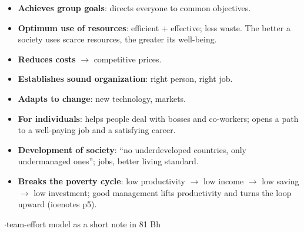 {\color{sub}\footnotesize {} }
\begin{itemize}
  \item \textbf{Achieves group goals}: directs everyone to common objectives.
  \item \textbf{Optimum use of resources}: efficient + effective; less waste. The better a
    society uses scarce resources, the greater its well-being.
  \item \textbf{Reduces costs} $\rightarrow$ competitive prices.
  \item \textbf{Establishes sound organization}: right person, right job.
  \item \textbf{Adapts to change}: new technology, markets.
  \item \textbf{For individuals}: helps people deal with bosses and co-workers; opens a
    path to a well-paying job and a satisfying career.
  \item \textbf{Development of society}: ``no underdeveloped countries, only undermanaged
    ones''; jobs, better living standard.
  \item \textbf{Breaks the poverty cycle}: low productivity $\rightarrow$ low income
    $\rightarrow$ low saving $\rightarrow$ low investment; good management lifts
    productivity and turns the loop upward (ioenotes p5).
\end{itemize}

{\color{sub}\footnotesize {}  \gap$\cdot$\gap team-effort model as a short note in 81 Bh}

